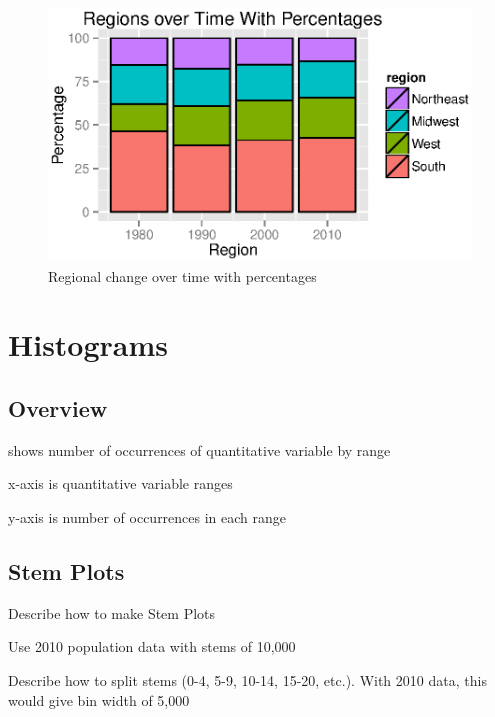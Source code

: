 \documentclass{exam}
\begin{document}
  \begin{figure}[H]
    \centering
    \includegraphics[scale = 0.9]{figures/regions_over_time_percentages.eps}
    \caption{Regional change over time with percentages}
  \end{figure}

  \section{Histograms}

  \subsection{Overview}
  \begin{itemize*}
    \item shows number of occurrences of quantitative variable by range
    \item x-axis is quantitative variable ranges
    \item y-axis is number of occurrences in each range
  \end{itemize*}

  \subsection{Stem Plots}
  \begin{itemize*}
    \item Describe how to make Stem Plots
    \item Use 2010 population data with stems of 10,000
    \item Describe how to split stems (0-4, 5-9, 10-14, 15-20, etc.).  With
      2010 data, this would give bin width of 5,000
  \end{itemize*}
\end{document}
